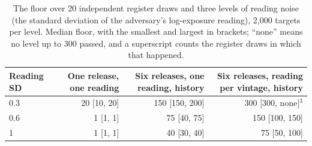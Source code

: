 \begin{table}[t]
\centering
\caption{The floor over 20 independent register draws and three levels of reading noise (the standard deviation of the adversary's log-exposure reading), 2{,}000 targets per level. Median floor, with the smallest and largest in brackets; ``none'' means no level up to 300 passed, and a superscript counts the register draws in which that happened.}
\label{tab:replication}
\small
\begin{tabular}{lrrr}
\toprule
Reading SD & One release, one reading & Six releases, one reading, history & Six releases, reading per vintage, history \\
\midrule
0.3 & 20 [10, 20] & 150 [150, 200] & 300 [300, none]$^{3}$ \\
0.6 & 1 [1, 1] & 75 [40, 75] & 150 [100, 150] \\
1 & 1 [1, 1] & 40 [30, 40] & 75 [50, 100] \\
\bottomrule
\end{tabular}
\end{table}
